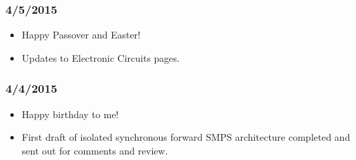 \subsubsection{4/5/2015}

\begin{itemize}
\item Happy Passover and Easter!
\item Updates to Electronic Circuits pages.
\end{itemize}

\subsubsection{4/4/2015}

\begin{itemize}
\item Happy birthday to me!
\item First draft of isolated synchronous forward SMPS architecture completed and sent out for comments and review.
\end{itemize}